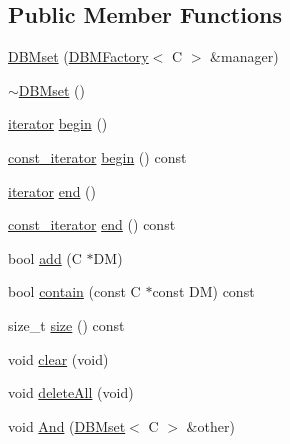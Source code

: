 \subsection*{Public Member Functions}
\begin{DoxyCompactItemize}
\item 
\mbox{\hyperlink{classgraphsat_1_1_d_b_mset_a2a0d8e81172aa1a865cf5819749a80a0}{D\+B\+Mset}} (\mbox{\hyperlink{classgraphsat_1_1_d_b_m_factory}{D\+B\+M\+Factory}}$<$ C $>$ \&manager)
\item 
\mbox{\hyperlink{classgraphsat_1_1_d_b_mset_aa0f809f2d7c58227bcde30f6c664c0c1}{$\sim$\+D\+B\+Mset}} ()
\item 
\mbox{\hyperlink{classgraphsat_1_1_d_b_mset_1_1iterator}{iterator}} \mbox{\hyperlink{classgraphsat_1_1_d_b_mset_a7aff13f25e4f4f43ceb9e07df6aea276}{begin}} ()
\item 
\mbox{\hyperlink{classgraphsat_1_1_d_b_mset_1_1const__iterator}{const\+\_\+iterator}} \mbox{\hyperlink{classgraphsat_1_1_d_b_mset_ac44e4e340d856eeabf26056092520e36}{begin}} () const
\item 
\mbox{\hyperlink{classgraphsat_1_1_d_b_mset_1_1iterator}{iterator}} \mbox{\hyperlink{classgraphsat_1_1_d_b_mset_ade948f2f96fe55fa3fba669c0035f6fe}{end}} ()
\item 
\mbox{\hyperlink{classgraphsat_1_1_d_b_mset_1_1const__iterator}{const\+\_\+iterator}} \mbox{\hyperlink{classgraphsat_1_1_d_b_mset_a036eed51ffdf1f6b4587d5f4138a7b87}{end}} () const
\item 
bool \mbox{\hyperlink{classgraphsat_1_1_d_b_mset_ad1b2bff46b84f263f58780296410fa0f}{add}} (C $\ast$DM)
\item 
bool \mbox{\hyperlink{classgraphsat_1_1_d_b_mset_a3ccc996dbe06983ad22b15791c0d8173}{contain}} (const C $\ast$const DM) const
\item 
size\+\_\+t \mbox{\hyperlink{classgraphsat_1_1_d_b_mset_a78f9765db0ac92c5b3247973b0e757bb}{size}} () const
\item 
void \mbox{\hyperlink{classgraphsat_1_1_d_b_mset_ade231bd44d2559778e4cfb95a9e97214}{clear}} (void)
\item 
void \mbox{\hyperlink{classgraphsat_1_1_d_b_mset_a0c9433f18627b5f4f4c7567663cf09a3}{delete\+All}} (void)
\item 
void \mbox{\hyperlink{classgraphsat_1_1_d_b_mset_a22765f57ebbe732d3e8cc55e1f6a83c0}{And}} (\mbox{\hyperlink{classgraphsat_1_1_d_b_mset}{D\+B\+Mset}}$<$ C $>$ \&other)
\end{DoxyCompactItemize}

